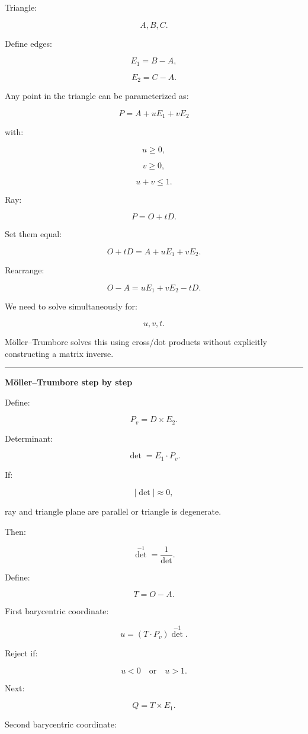 Triangle:

\[
A,B,C.
\]

Define edges:

\[
E_1=B-A,
\]

\[
E_2=C-A.
\]

Any point in the triangle can be parameterized as:

\[
P=A+uE_1+vE_2
\]

with:

\[
u\ge0,
\]

\[
v\ge0,
\]

\[
u+v\le1.
\]

Ray:

\[
P=O+tD.
\]

Set them equal:

\[
O+tD
=
A+uE_1+vE_2.
\]

Rearrange:

\[
O-A
=
uE_1+vE_2-tD.
\]

We need to solve simultaneously for:

\[
u,v,t.
\]

Möller--Trumbore solves this using cross/dot products without explicitly constructing a matrix inverse.

\begin{center}\rule{0.5\linewidth}{0.5pt}\end{center}

\textbf{Möller--Trumbore step by step}

Define:

\[
P_v=D\times E_2.
\]

Determinant:

\[
\boxed{
\det=
E_1\cdot P_v.
}
\]

If:

\[
|\det|\approx0,
\]

ray and triangle plane are parallel or triangle is degenerate.

Then:

\[
\det^{-1}=\frac1{\det}.
\]

Define:

\[
T=O-A.
\]

First barycentric coordinate:

\[
\boxed{
u=
(T\cdot P_v)\det^{-1}.
}
\]

Reject if:

\[
u<0
\quad\text{or}\quad
u>1.
\]

Next:

\[
Q=T\times E_1.
\]

Second barycentric coordinate:

